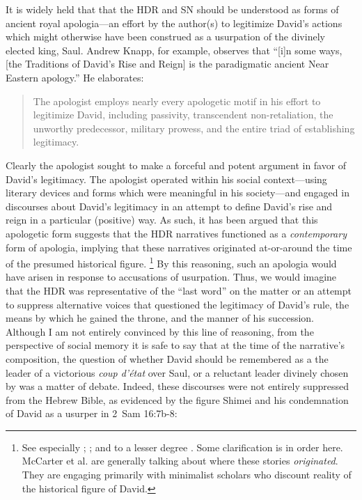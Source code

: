 It is widely held that that the HDR and SN should be understood as forms of ancient royal apologia---an effort by the author(s) to legitimize David's actions which might otherwise have been construed as a usurpation of the divinely elected king, Saul. Andrew Knapp, for example, observes that ``[i]n some ways, [the Traditions of David's Rise and Reign] is the paradigmatic ancient Near Eastern apology.''%
    \autocite[218]{knapp2015}
He elaborates:

\begin{quote}
    The apologist employs nearly every apologetic motif in his effort to legitimize David, including passivity, transcendent non-retaliation, the unworthy predecessor, military prowess, and the entire triad of establishing legitimacy.%
    \autocite{knapp2015}
\end{quote}
\noindent
Clearly the apologist sought to make a forceful and potent argument in favor of David's legitimacy. The apologist operated within his social context---using literary devices and forms which were meaningful in his society---and engaged in discourses about David's legitimacy in an attempt to define David's rise and reign in a particular (positive) way. As such, it has been argued that this apologetic form suggests that the HDR narratives functioned as a \emph{contemporary} form of apologia, implying that these narratives originated at-or-around the time of the presumed historical figure.%
    \footnote{See especially \cite{mccarter_interpretation1981}; \cite{mccarter_jbl1980}; and to a lesser degree \cite[75--76]{halpern2001}. Some clarification is in order here. McCarter et al. are generally talking about where these stories \emph{originated}. They are engaging primarily with minimalist scholars who discount reality of the historical figure of David.}
By this reasoning, such an apologia would have arisen in response to accusations of usurpation. Thus, we would imagine that the HDR was representative of the ``last word'' on the matter or an attempt to suppress alternative voices that questioned the legitimacy of David's rule, the means by which he gained the throne, and the manner of his succession. Although I am not entirely convinced by this line of reasoning, from the perspective of social memory it is safe to say that at the time of the narrative's composition, the question of whether David should be remembered as a the leader of a victorious \emph{coup d'état} over Saul, or a reluctant leader divinely chosen by \yahweh was a matter of debate. Indeed, these discourses were not entirely suppressed from the Hebrew Bible, as evidenced by the figure Shimei and his condemnation of David as a usurper in 2~Sam 16:7b-8:
